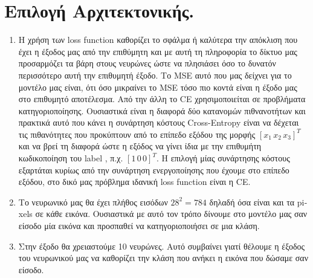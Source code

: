 \documentclass[12pt,a4paper]{article}
\newcommand{\tl}{\textlatin}
\begin{document}
    \section{Επιλογή Αρχιτεκτονικής.}

    \begin{enumerate}[a]
        \item Η χρήση των \tl{loss function} καθορίζει το σφάλμα ή καλύτερα την απόκλιση που έχει η έξοδος μας από την επιθύμητη και με αυτή τη πληροφορία το δίκτυο μας προσαρμόζει τα βάρη στους νευρώνες ώστε να πλησιάσει όσο το δυνατόν περισσότερο αυτή την επιθυμητή έξοδο. Το \tl{MSE} αυτό που μας δείχνει για το μοντέλο μας είναι, ότι όσο μικραίνει το \tl{MSE} τόσο πιο κοντά είναι η έξοδο μας στο επιθυμητό αποτέλεσμα. Από την άλλη το \tl{CE} χρησιμοποιείται σε προβλήματα κατηγοριοποίησης. Ουσιαστικά είναι η διαφορά δύο κατανομών πιθνανοτήτων και πρακτικά αυτό που κάνει η συνάρτηση κόστους \tl{Cross-Entropy} είναι να δέχεται τις πιθανότητες που προκύπτουν από το επίπεδο εξόδου της μορφής $[x_1\, x_2\, x_3]^T$ και να βρεί τη διαφορά ώστε η εξόδος να γίνει ίδια με την επιθυμήτη κωδικοποίηση του \tl{label} , π.χ. $[1\, 0\, 0 ]^T$.
        Η επιλογή μίας συνάρτησης κόστους εξαρτάται κυρίως από την συνάρτηση ενεργοποίησης που έχουμε στο επίπεδο εξόδου, στο δικό μας πρόβλημα ιδανική  \tl{loss function} είναι η \tl{CE}.

        \item Το νευρωνικό μας θα έχει πλήθος εισόδων $ 28^2 = 784 $ δηλαδή όσα είναι και  τα \tl{pixels} σε κάθε εικόνα. Ουσιαστικά με αυτό τον τρόπο δίνουμε στο μοντέλο μας σαν είσοδο μία εικόνα και προσπαθεί να κατηγοριοποιήσει σε μια κλάση. 

        \item Στην έξοδο θα χρειαστούμε 10 νευρώνες.  Αυτό συμβαίνει γιατί θέλουμε η έξοδος του νευρωνικού μας να καθορίζει την κλάση που ανήκει η εικόνα που δώσαμε σαν είσοδο.


\end{enumerate}
\end{document}
